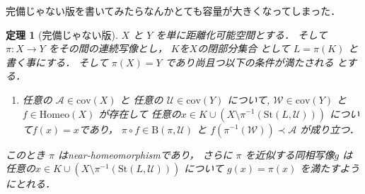 \documentclass[leqno, a4paper, 12pt]{jsarticle}
\numberwithin{equation}{section}
\newtheorem{thm}{定理}
\newcommand{\yocov}[1]{\mathrm{cov}(#1)}
\newcommand{\yocovfont}[1]{\mathscr{#1}}
\newcommand{\yofine}{\prec}
\newcommand{\yost}[1]{\mathrm{St}(#1)}
\newcommand{\yonbset}[2]{\mathrm{B}(#1, #2)}
\newcommand{\yomaphset}[1]{\mathrm{Homeo}(#1)}
\begin{document}
完備じゃない版を書いてみたらなんかとても容量が大きくなってしまった．
\begin{thm}[完備じゃない版]\label{thm:mainincomp}
$X$
と
$Y$
を単に距離化可能空間とする．
そして
$\pi \colon X\to Y$
をその間の連続写像とし，
$K$を$X$の閉部分集合
として
$L=\pi(K)$
と書く事にする．
そして
$\pi(X)=Y$
であり尚且つ以下の条件が満たされる
とする．
\begin{enumerate}[label=\textup{(Bing-incomp)}, leftmargin=*]
\item\label{item:bingconditionincomp}
任意の
$\yocovfont{A}\in \yocov{X}$
と
任意の
$\yocovfont{U}\in \yocov{Y}$
について, 
$\yocovfont{W}\in \yocov{Y}$
と
$f\in \yomaphset{X}$
が存在して
任意の$x\in K\cup (X\setminus \pi^{-1}(\yost{L, \yocovfont{U}}))$
について$f(x)=x$であり，
$\pi\circ f\in \yonbset{\pi}{\yocovfont{U}}$
と
$f(\pi^{-1}(\yocovfont{W}))\yofine \yocovfont{A}$
が成り立つ．
\end{enumerate}
このとき
$\pi$
はnear-homeomorphismであり，
さらに
$\pi$
を近似する同相写像$g$
は
任意の$x\in K\cup (X\setminus \pi^{-1}(\yost{L, \yocovfont{U}}))$
について
$g(x)=\pi(x)$
を満たすようにとれる．
\end{thm}
\end{document}
